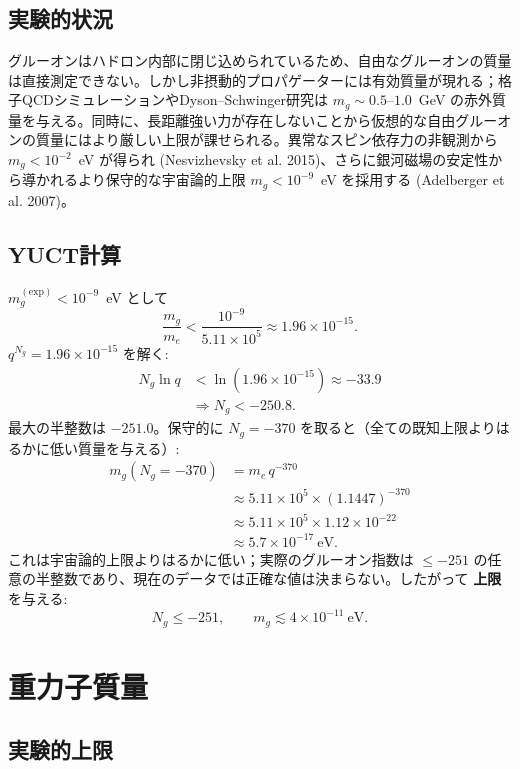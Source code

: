 \documentclass[11pt,a4paper]{article}
\begin{document}
	\subsection{実験的状況}
	
	グルーオンはハドロン内部に閉じ込められているため、自由なグルーオンの質量は直接測定できない。しかし非摂動的プロパゲーターには有効質量が現れる；格子QCDシミュレーションやDyson–Schwinger研究は $m_g \sim 0.5$–$1.0$~GeV の赤外質量を与える。同時に、長距離強い力が存在しないことから仮想的な自由グルーオンの質量にはより厳しい上限が課せられる。異常なスピン依存力の非観測から $m_g < 10^{-2}$~eV が得られ (Nesvizhevsky et al. 2015)、さらに銀河磁場の安定性から導かれるより保守的な宇宙論的上限 $m_g < 10^{-9}$~eV を採用する (Adelberger et al. 2007)。
	
	\subsection{YUCT計算}
	
	$m_g^{\mathrm{(exp)}} < 10^{-9}$~eV として
	\[
	\frac{m_g}{m_e} < \frac{10^{-9}}{5.11\times10^5} \approx 1.96\times 10^{-15}.
	\]
	$q^{N_g} = 1.96\times10^{-15}$ を解く:
	\[
	\begin{aligned}
		N_g \ln q &< \ln(1.96\times10^{-15}) \approx -33.9 \\
		&\Longrightarrow N_g < -250.8 .
	\end{aligned}
	\]
	最大の半整数は $-251.0$。保守的に $N_g = -370$ を取ると（全ての既知上限よりはるかに低い質量を与える）:
	\[
	\begin{aligned}
		m_g(N_g = -370) &= m_e \, q^{-370} \\
		&\approx 5.11\times10^5 \times (1.1447)^{-370} \\
		&\approx 5.11\times10^5 \times 1.12\times10^{-22} \\
		&\approx 5.7 \times 10^{-17}~\mathrm{eV}.
	\end{aligned}
	\]
	これは宇宙論的上限よりはるかに低い；実際のグルーオン指数は $\le -251$ の任意の半整数であり、現在のデータでは正確な値は決まらない。したがって \textbf{上限} を与える:
	\[
	\boxed{N_g \le -251}, \qquad
	\boxed{m_g \lesssim 4 \times 10^{-11}~\mathrm{eV}} .
	\]
	
	\section{重力子質量}
	
	\subsection{実験的上限}
	
\end{document}
